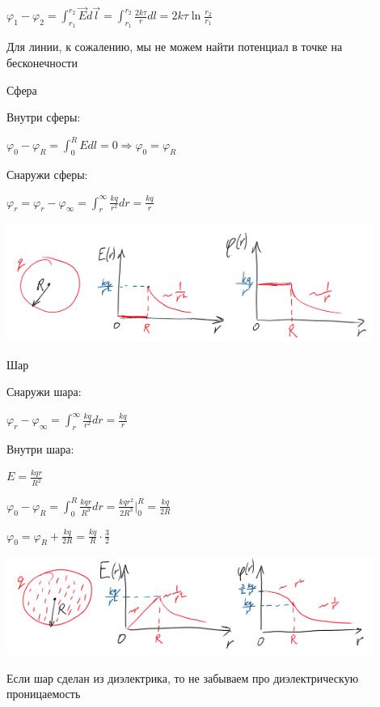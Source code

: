 \documentclass[12pt]{article}
\begin{document}
$\varphi_1 - \varphi_2 = \int_{r_1}^{r_2} \vec{E}d\vec{l} = \int_{r_1}^{r_2} \frac{2k\tau}{r} dl = 2k\tau \ln\frac{r_2}{r_1}$

Для линии, к сожалению, мы не можем найти потенциал в точке на бесконечности

 Сфера

Внутри сферы:

$\varphi_0 - \varphi_R = \int_0^R Edl = 0 \Longrightarrow \varphi_0 = \varphi_R$

Снаружи сферы:

$\varphi_r = \varphi_r - \varphi_\infty = \int_r^\infty \frac{kq}{r^2} dr = \frac{kq}{r}$

\begin{center}
    \includegraphics[width=0.9\textwidth]{physics1/images/physics1_2024_11_25_3}
\end{center}

 Шар

Снаружи шара:

$\varphi_r - \varphi_\infty = \int_r^\infty \frac{kq}{r^2} dr = \frac{kq}{r}$

Внутри шара:

$E = \frac{kqr}{R^2}$

$\varphi_0 - \varphi_R = \int_0^R \frac{kqr}{R^3} dr = \frac{kqr^2}{2R^3} \Big|_0^R = \frac{kq}{2R}$

$\varphi_0 = \varphi_R + \frac{kq}{2R} = \frac{kq}{R} \cdot \frac{3}{2}$

\begin{center}
    \includegraphics[width=0.9\textwidth]{physics1/images/physics1_2024_11_25_4}
\end{center}

\Nota Если шар сделан из диэлектрика, то не забываем про диэлектрическую проницаемость
\end{document}
